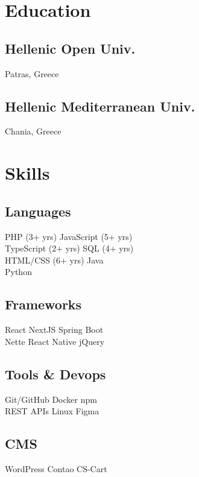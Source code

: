 \documentclass[]{deedy-resume-reversed}
\begin{document}
\begin{minipage}[t]{0.30\textwidth}


\section{Education}

\subsection{Hellenic Open Univ.}
Patras, Greece
\sectionsep

\subsection{Hellenic Mediterranean Univ.}
Chania, Greece
\sectionsep


\section{Skills}

\subsection{Languages}
PHP (3+ yrs) \textbullet{} JavaScript (5+ yrs) \\
TypeScript (2+ yrs) \textbullet{} SQL (4+ yrs) \\
HTML/CSS (6+ yrs) \textbullet{} Java \\
Python
\sectionsep

\subsection{Frameworks}
React \textbullet{} NextJS \textbullet{} Spring Boot \\
Nette \textbullet{} React Native \textbullet{} jQuery
\sectionsep

\subsection{Tools \& Devops}
Git/GitHub \textbullet{} Docker \textbullet{} npm \\
REST APIs \textbullet{} Linux \textbullet{} Figma
\sectionsep

\subsection{CMS}
WordPress \textbullet{} Contao \textbullet{} CS-Cart
\sectionsep

\end{minipage}
\end{document}
